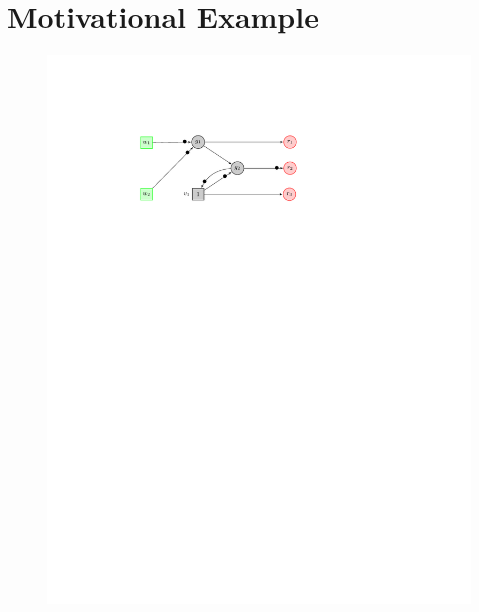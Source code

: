 \section{Motivational Example}
\label{sec:Classification:Example}
\begin{figure}[!t]
	\begin{minipage}{0.6\textwidth}
	\begin{framed}
	\includegraphics[width=\textwidth]{Example.pdf}
	\end{framed}
	\end{minipage}
	\begin{minipage}{0.35\textwidth}
	\centering
	\begin{framed}

\end{framed}
\end{minipage}
\end{figure}

